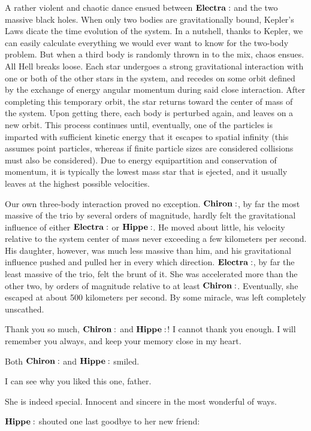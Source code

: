 \documentclass[main.tex]{subfiles}
\begin{document}
A rather violent and chaotic dance ensued between $\Electra$ and the two massive black holes.  When only two bodies are gravitationally bound, Kepler's Laws dicate the time evolution of the system.  In a nutshell, thanks to Kepler, we can easily calculate everything we would ever want to know for the two-body problem.  But when a third body is randomly thrown in to the mix, chaos ensues.  All Hell breaks loose.  Each star undergoes a strong gravitational interaction with one or both of the other stars in the system, and recedes on some orbit defined by the exchange of energy angular momentum during said close interaction.  After completing this temporary orbit, the star returns toward the center of mass of the system.  Upon getting there, each body is perturbed again, and leaves on a new orbit.  This process continues until, eventually, one of the particles is imparted with sufficient kinetic energy that it escapes to spatial infinity (this assumes point particles, whereas if finite particle sizes are considered collisions must also be considered).  Due to energy equipartition and conservation of momentum, it is typically the lowest mass star that is ejected, and it usually leaves at the highest possible velocities.  

Our own three-body interaction proved no exception.  $\Chiron$, by far the most massive of the trio by several orders of magnitude, hardly felt the gravitational influence of either $\Electra$ or $\Hippe$.  He moved about little, his velocity relative to the system center of mass never exceeding a few kilometers per second.  His daughter, however, was much less massive than him, and his gravitational influence pushed and pulled her in every which direction.  $\Electra$, by far the least massive of the trio, felt the brunt of it.  She was accelerated more than the other two, by orders of magnitude relative to at least $\Chiron$.  Eventually, she escaped at about 500 kilometers per second.  By some miracle, was left completely unscathed.

\Electra Thank you so much, $\Chiron$ and $\Hippe$!  I cannot thank you enough.  I will remember you always, and keep your memory close in my heart.

Both $\Chiron$ and $\Hippe$ smiled.

\Hippe I can see why you liked this one, father.

\Chiron She is indeed special.  Innocent and sincere in the most wonderful of ways.

$\Hippe$ shouted one last goodbye to her new friend:
\end{document}
